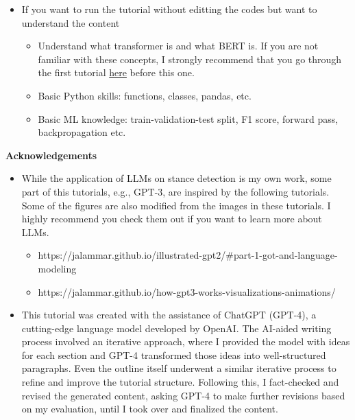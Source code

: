 \documentclass[11pt]{article}
\providecommand{\tightlist}{%
      \setlength{\itemsep}{0pt}\setlength{\parskip}{0pt}}
\begin{document}
\begin{itemize}
\tightlist
\item
  If you want to run the tutorial without editting the codes but want to
  understand the content

  \begin{itemize}
  \tightlist
  \item
    Understand what transformer is and what BERT is. If you are not
    familiar with these concepts, I strongly recommend that you go
    through the first tutorial
    \href{https://colab.research.google.com/drive/1nxziaKStwRnSyOLI6pLNBaAnB_aB6IsE?usp=sharing}{here}
    before this one.
  \item
    Basic Python skills: functions, classes, pandas, etc.
  \item
    Basic ML knowledge: train-validation-test split, F1 score, forward
    pass, backpropagation etc.
  \end{itemize}
\end{itemize}

    \textbf{Acknowledgements}

\begin{itemize}
\tightlist
\item
  While the application of LLMs on stance detection is my own work, some
  part of this tutorials, e.g., GPT-3, are inspired by the following
  tutorials. Some of the figures are also modified from the images in
  these tutorials. I highly recommend you check them out if you want to
  learn more about LLMs.

  \begin{itemize}
  \tightlist
  \item
    https://jalammar.github.io/illustrated-gpt2/\#part-1-got-and-language-modeling
  \item
    https://jalammar.github.io/how-gpt3-works-visualizations-animations/
  \end{itemize}
\item
  This tutorial was created with the assistance of ChatGPT (GPT-4), a
  cutting-edge language model developed by OpenAI. The AI-aided writing
  process involved an iterative approach, where I provided the model
  with ideas for each section and GPT-4 transformed those ideas into
  well-structured paragraphs. Even the outline itself underwent a
  similar iterative process to refine and improve the tutorial
  structure. Following this, I fact-checked and revised the generated
  content, asking GPT-4 to make further revisions based on my
  evaluation, until I took over and finalized the content.
\end{itemize}
\end{document}
